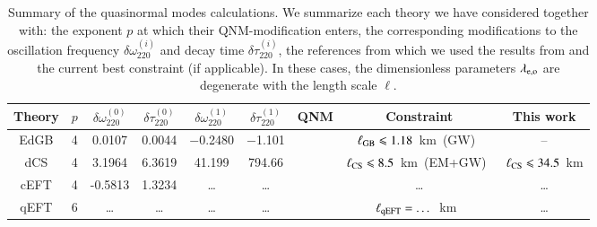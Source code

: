 \documentclass[twocolumn,prd,aps,superscriptaddress,preprintnumbers,tightenlines,showpacs,nofootinbib,amsfonts,amsmath,longbibliography]{revtex4-1}
\newcommand{\hs}[1]{{\textcolor{blue}{{[HS: #1]}} }}
\begin{document}
\begin{table}[th]
\begin{tabular}{c | c c c c c c c c}
\hline
\hline
Theory & $p$ & $\delta \omega^{(0)}_{220}$ & $\delta \tau^{(0)}_{220}$ & $\delta \omega^{(1)}_{220}$ & $\delta \tau^{(1)}_{220}$ & QNM & Constraint & This work \\
\hline
EdGB      & 4 & 0.0107 & 0.0044 & $-$0.2480 & $-$1.101 &  \cite{Blazquez-Salcedo:2016enn,Pierini:2021jxd} & $\ell_{\rm GB} \leqslant 1.18$~km~(GW)~\cite{Lyu:2022gdr} & -- \\
dCS       & 4 & 3.1964 & 6.3619 & 41.199 & 794.66 &  \cite{Wagle:2021tam}   & $\ell_{\rm CS} \leqslant 8.5$~km~(EM+GW)~\cite{Silva:2020acr}  & $\ell_{\rm CS} \leqslant 34.5$~km \\
cEFT  & 4 & -0.5813  & 1.3234 & \dots & \dots & \cite{Cano:2021myl} & \dots  & \dots \\
qEFT  & 6 & \dots  & \dots & \dots & \dots & \cite{Cano:2021myl} & $\ell_{\rm qEFT} = \dots$~km~\cite{Sennett:2019bpc}  & \dots \\
\hline
\hline
\end{tabular}
\caption{Summary of the quasinormal modes calculations.
%
We summarize each theory we have considered together with: the exponent $p$ at
which their QNM-modification enters, the corresponding modifications to the
oscillation frequency $\delta \omega^{(i)}_{220}$ and decay time $\delta \tau^{(i)}_{220}$, the
references from which we used the results from and the current best constraint
(if applicable).
%
%
In these cases, the dimensionless parameters $\lambda_{\rm e,o}$ are degenerate
with the length scale $\ell$.
%
}
\label{tab:ref_theories_qnms}
\end{table}

\end{document}
